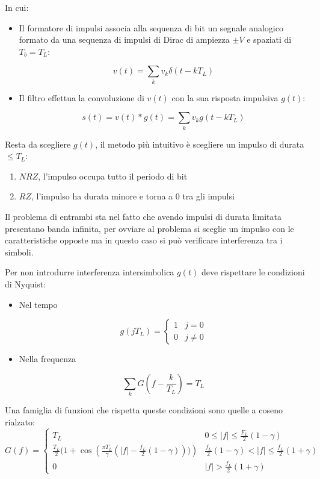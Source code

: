 \documentclass{article}
\begin{document}
\noindent In cui:
\begin{itemize}
    \item Il formatore di impulsi associa alla sequenza di bit un segnale analogico formato da una sequenza di impulsi di Dirac di ampiezza $\pm V$ e spaziati di $T_b=T_L$:

        $$v(t)=\sum_kv_k\delta(t-kT_L)$$

    \item Il filtro effettua la convoluzione di $v(t)$ con la sua risposta impulsiva $g(t)$:

    $$s(t)=v(t)*g(t)=\sum_kv_kg(t-kT_L)$$\newline
    
\end{itemize}

\noindent Resta da scegliere $g(t)$, il metodo più intuitivo è scegliere un impulso di durata $\leq T_L$:
\begin{enumerate}
    \item $NRZ$, l'impulso occupa tutto il periodo di bit
    \item $RZ$, l'impulso ha durata minore e torna a 0 tra gli impulsi\newline
\end{enumerate}

\noindent Il problema di entrambi sta nel fatto che avendo impulsi di durata limitata presentano banda infinita, per ovviare al problema si sceglie un impulso con le caratteristiche opposte ma in questo caso si può verificare interferenza tra i simboli.\newline

\noindent Per non introdurre interferenza intersimbolica $g(t)$ deve rispettare le condizioni di Nyquist:
\begin{itemize}
    \item Nel tempo

        \[g(jT_L)=\begin{cases}
            1 & j=0\\
            0 & j\neq 0
        \end{cases}\]

    \item Nella frequenza

        $$\sum_kG(f-\frac{k}{T_L})=T_L$$\newline
    
\end{itemize}

\noindent Una famiglia di funzioni che rispetta queste condizioni sono quelle a coseno rialzato:
\[G(f)=\begin{cases}
    T_L & 0\leq|f|\leq\frac{F_L}{2}(1-\gamma)\\
    \frac{T_L}{2}(1+\cos({\frac{\pi T_L}{\gamma}(|f|-\frac{f_L}{2}(1-\gamma)))}) & \frac{f_L}{2}(1-\gamma)<|f|\leq\frac{f_L}{2}(1+\gamma)\\
    0 & |f|>\frac{f_L}{2}(1+\gamma)
\end{cases}\]
\end{document}
